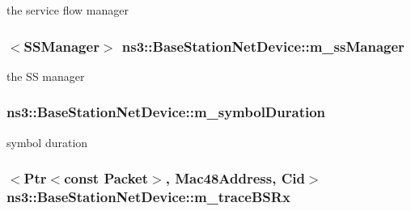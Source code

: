 the service flow manager 

\subsubsection[{\texorpdfstring{m\+\_\+ss\+Manager}{m_ssManager}}]{$<${\bf S\+S\+Manager}$>$ ns3\+::\+Base\+Station\+Net\+Device\+::m\+\_\+ss\+Manager\hspace{0.3cm}{\ttfamily [private]}}\hypertarget{classns3_1_1BaseStationNetDevice_a2365fd053319dda930081e661e6381a6}{}\label{classns3_1_1BaseStationNetDevice_a2365fd053319dda930081e661e6381a6}


the SS manager 

\subsubsection[{\texorpdfstring{m\+\_\+symbol\+Duration}{m_symbolDuration}}]{ ns3\+::\+Base\+Station\+Net\+Device\+::m\+\_\+symbol\+Duration\hspace{0.3cm}{\ttfamily [private]}}\hypertarget{classns3_1_1BaseStationNetDevice_aa05b0ce117a76f70b9c4062d9d687e57}{}\label{classns3_1_1BaseStationNetDevice_aa05b0ce117a76f70b9c4062d9d687e57}


symbol duration 

\subsubsection[{\texorpdfstring{m\+\_\+trace\+B\+S\+Rx}{m_traceBSRx}}]{$<${\bf Ptr}$<$const {\bf Packet}$>$, {\bf Mac48\+Address}, {\bf Cid}$>$ ns3\+::\+Base\+Station\+Net\+Device\+::m\+\_\+trace\+B\+S\+Rx\hspace{0.3cm}{\ttfamily [private]}}\hypertarget{classns3_1_1BaseStationNetDevice_a0eb479748371aa4a19d45a57434020b8}{}\label{classns3_1_1BaseStationNetDevice_a0eb479748371aa4a19d45a57434020b8}


